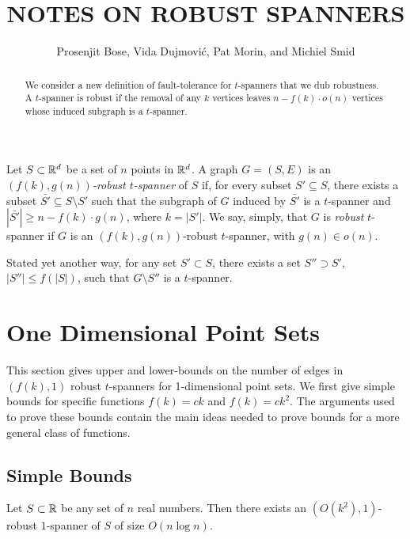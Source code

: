 \documentclass{patmorin}
\title{\MakeUppercase{Notes on Robust Spanners}}
\author{Prosenjit Bose, Vida Dujmovi\'c, Pat Morin, and Michiel Smid}
\begin{document}
\maketitle

\begin{abstract}
We consider a new definition of fault-tolerance for $t$-spanners that
we dub robustness.  A $t$-spanner is robust if the removal of any $k$
vertices leaves $n-f(k)\cdot o(n)$ vertices whose induced subgraph is
a $t$-spanner.
\end{abstract}

Let $S\subset \mathbb{R}^d$ be a set of $n$ points in $\mathbb{R}^d$.  A graph $G=(S,E)$
is an \emph{$(f(k),g(n))$-robust $t$-spanner} of $S$ if, for every subset
$S'\subseteq S$, there exists a subset $\bar{S'}\subseteq S\setminus S'$
such that the subgraph of $G$ induced by $\bar{S'}$ is a $t$-spanner
and $|\bar{S'}|\ge n-f(k)\cdot g(n)$, where $k=|S'|$.  We say, simply,
that $G$ is \emph{robust} $t$-spanner if $G$ is an $(f(k),g(n))$-robust
$t$-spanner, with $g(n)\in o(n)$.

Stated yet another way, for any set $S'\subset S$, there exists a set
$S''\supset S'$, $|S''|\le f(|S|)$, such that $G\setminus S''$ is
a $t$-spanner.

\section{One Dimensional Point Sets}

This section gives upper and lower-bounds on the number of edges in
$(f(k),1)$ robust $t$-spanners for 1-dimensional point sets.  We first
give simple bounds for specific functions $f(k)=ck$ and $f(k)=ck^2$.
The arguments used to prove these bounds contain the main ideas needed
to prove bounds for a more general class of functions.

\subsection{Simple Bounds}

\begin{thm}
Let $S\subset \mathbb{R}$ be any set of $n$ real numbers.  Then there exists an
$(O(k^2),1)$-robust $1$-spanner of $S$ of size $O(n\log n)$.
\end{thm}
\end{document}
